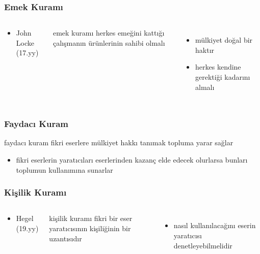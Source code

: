 \documentclass[dvipsnames]{beamer}
\theoremstyle{definition}
\theoremstyle{example}
\theoremstyle{plain}
\begin{document}
\begin{frame}
  \frametitle{Emek Kuramı}

  \begin{columns}
    \begin{center}
      \begin{itemize}
        \item John Locke (17.yy)
      \end{itemize}
    \end{center}

    \begin{block}{emek kuramı}
        herkes emeğini kattığı çalışmanın ürünlerinin sahibi olmalı
    \end{block}
    \begin{itemize}
      \item mülkiyet doğal bir haktır
      \item herkes kendine gerektiği kadarını almalı
    \end{itemize}
  \end{columns}
\end{frame}

\begin{frame}
  \frametitle{Faydacı Kuram}

  \begin{block}{faydacı kuram}
    fikri eserlere mülkiyet hakkı tanımak topluma yarar sağlar
  \end{block}

  \begin{itemize}
    \item fikri eserlerin yaratıcıları eserlerinden kazanç elde edecek
      olurlarsa bunları toplumun kullanımına sunarlar
  \end{itemize}
\end{frame}

\begin{frame}
  \frametitle{Kişilik Kuramı}

  \begin{columns}
    \begin{center}
      \begin{itemize}
        \item Hegel (19.yy)
      \end{itemize}
    \end{center}

    \begin{block}{kişilik kuramı}
      fikri bir eser yaratıcısının kişiliğinin bir uzantısıdır
    \end{block}

    \begin{itemize}
      \item nasıl kullanılacağını eserin yaratıcısı denetleyebilmelidir
    \end{itemize}
  \end{columns}
\end{frame}
\end{document}
